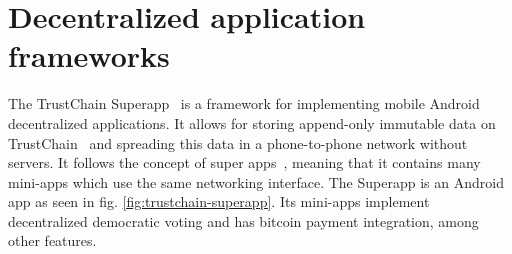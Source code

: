 
\section{Decentralized application frameworks}
\label{sec:sote-trustchain}
The TrustChain Superapp~\citep{mattskala2020} is a framework for implementing mobile Android decentralized applications. It allows for storing append-only immutable data on TrustChain~\citep{otte2017trustchain} and spreading this data in a phone-to-phone network without servers. It follows the concept of super apps~\citep{kpmg2019superapps}, meaning that it contains many mini-apps which use the same networking interface. The Superapp is an Android app as seen in fig. \ref{fig:trustchain-superapp}. Its mini-apps implement decentralized democratic voting and has bitcoin payment integration, among other features.

